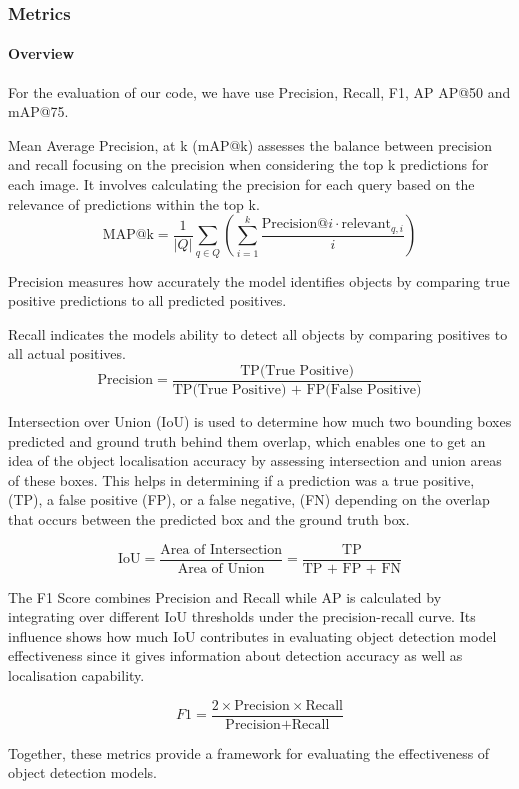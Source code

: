 \documentclass{IEEEtran}
\begin{document}
	\subsubsection{Metrics}
	\paragraph{Overview}
	For the evaluation of our code, we have use Precision, Recall, F1,  AP
	AP@50 and mAP@75.
	
	Mean Average Precision, at k (mAP@k) assesses the balance between precision and recall focusing on the precision when considering the top k predictions for each image. It involves calculating the precision for each query based on the relevance of predictions within the top k. 
	\[ \text{MAP@k} = \frac{1}{|Q|} \sum_{q \in Q} \left( \sum_{i=1}^{k} \frac{\text{Precision}@i \cdot \text{relevant}_{q,i}}{i} \right) \]
	
	Precision measures how accurately the model identifies objects by comparing true positive predictions to all predicted positives. 
	
	Recall indicates the models ability to detect all objects by comparing positives to all actual positives. 
	\[
	\text{Precision} = \frac{\text{TP(True Positive)}}{\text{TP(True Positive) + FP(False Positive)}}
	\] 
	
	Intersection over Union (IoU) is used to determine how much two bounding boxes predicted and ground truth behind them overlap, which enables one to get an idea of the object localisation accuracy by assessing intersection and union areas of these boxes. 
	This helps in determining if a prediction was a true positive, (TP), a false positive (FP), or a false negative, (FN) depending on the overlap that occurs between the predicted box and the ground truth box. 
	
	\[
	\text{IoU} = \frac{\text{Area of Intersection}}{\text{Area of Union}} = \frac{\text{TP}}{\text{TP + FP + FN}}
	\]
	
	The F1 Score combines Precision and Recall while AP is calculated by integrating over different IoU thresholds under the precision-recall curve. Its influence shows how much IoU contributes in evaluating object detection model effectiveness since it gives information about detection accuracy as well as localisation capability.
	
	\[
	F1 = \frac{2 \times \text{Precision} \times \text{Recall}}{\text{Precision} + \text{Recall}}
	\]
	
	Together, these metrics provide a framework for evaluating the effectiveness of object detection models.
	
\end{document}
